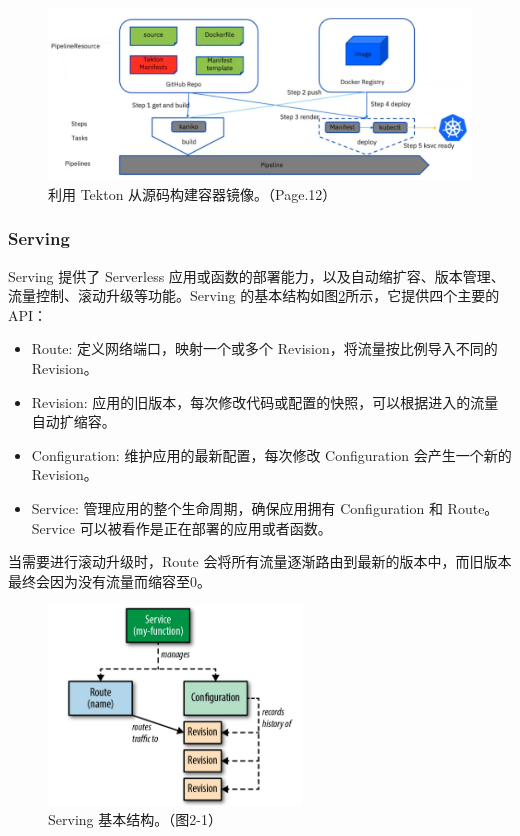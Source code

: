 \documentclass[11pt]{article}
\begin{document}
\begin{figure}[!htbp]
	\centering
	\includegraphics[width=1.0\linewidth]{figs/knative-source_to_image}
	\caption{利用 Tekton 从源码构建容器镜像。（\cite{knative-source_to_image}Page.12）}
	\label{figs:knative-source_to_image}
\end{figure}

\subsubsection{Serving}
Serving 提供了 Serverless 应用或函数的部署能力，以及自动缩扩容、版本管理、流量控制、滚动升级等功能。Serving 的基本结构如图\ref{knative-serving}所示，它提供四个主要的 API\cite{knative-servingapi}：
\begin{itemize}
	\item Route: 定义网络端口，映射一个或多个 Revision，将流量按比例导入不同的 Revision。
	\item Revision: 应用的旧版本，每次修改代码或配置的快照，可以根据进入的流量自动扩缩容。
	\item Configuration: 维护应用的最新配置，每次修改 Configuration 会产生一个新的 Revision。
	\item Service: 管理应用的整个生命周期，确保应用拥有 Configuration 和 Route。Service 可以被看作是正在部署的应用或者函数。
\end{itemize}
当需要进行滚动升级时，Route 会将所有流量逐渐路由到最新的版本中，而旧版本最终会因为没有流量而缩容至0。

\begin{figure}[!htbp]
	\centering
	\includegraphics[width=0.6\textwidth]{figs/knative-serving.png}
	\caption{Serving 基本结构。（\cite{mcclain2019getting}图2-1）}
	\label{knative-serving}
\end{figure}
\end{document}
